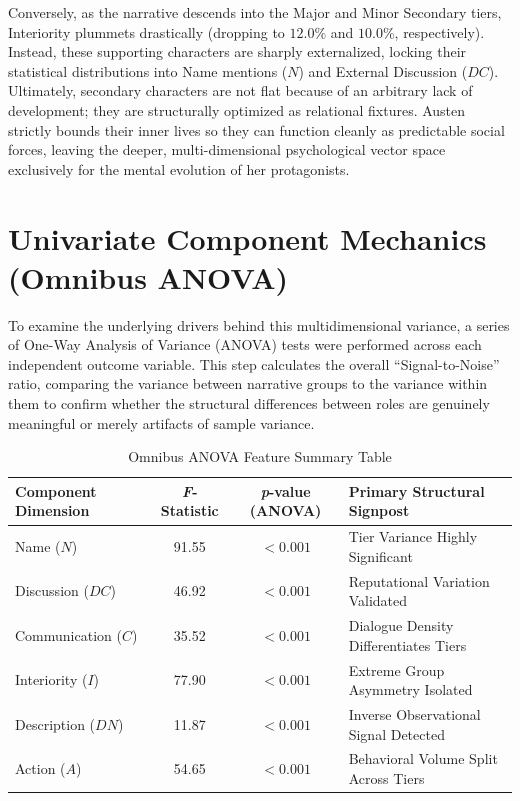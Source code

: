 Conversely, as the narrative descends into the Major and Minor Secondary tiers, Interiority plummets drastically (dropping to $12.0\%$ and $10.0\%$, respectively). Instead, these supporting characters are sharply externalized, locking their statistical distributions into Name mentions ($N$) and External Discussion ($DC$). Ultimately, secondary characters are not flat because of an arbitrary lack of development; they are structurally optimized as relational fixtures. Austen strictly bounds their inner lives so they can function cleanly as predictable social forces, leaving the deeper, multi-dimensional psychological vector space exclusively for the mental evolution of her protagonists.

\section{Univariate Component Mechanics (Omnibus ANOVA)}
To examine the underlying drivers behind this multidimensional variance, a series of One-Way Analysis of Variance (ANOVA) tests were performed across each independent outcome variable. This step calculates the overall ``Signal-to-Noise'' ratio, comparing the variance between narrative groups to the variance within them to confirm whether the structural differences between roles are genuinely meaningful or merely artifacts of sample variance.

\begin{table}[H]
\centering
\caption{Omnibus ANOVA Feature Summary Table}
\label{tab:anova_omnibus}
\vspace{2mm}
\small
\begin{tabular}{lccl}
\toprule
\textbf{Component Dimension} & \textbf{\textit{F}-Statistic} & \textbf{\textit{p}-value (ANOVA)} & \textbf{Primary Structural Signpost} \\
\midrule
Name ($N$)                   & 91.55 & $< 0.001$ & Tier Variance Highly Significant \\
Discussion ($DC$)            & 46.92 & $< 0.001$ & Reputational Variation Validated \\
Communication ($C$)          & 35.52 & $< 0.001$ & Dialogue Density Differentiates Tiers \\
Interiority ($I$)            & 77.90 & $< 0.001$ & Extreme Group Asymmetry Isolated \\
Description ($DN$)           & 11.87 & $< 0.001$ & Inverse Observational Signal Detected \\
Action ($A$)                 & 54.65 & $< 0.001$ & Behavioral Volume Split Across Tiers \\
\bottomrule
\end{tabular}
\end{table}

